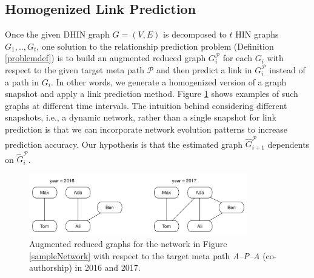 
\subsection{Homogenized Link Prediction}\label{def:HLP}

Once the given DHIN graph $G=(V,E)$ is decomposed to $t$ HIN graphs $G_1, .., G_t$, one solution to the relationship prediction problem (Definition \ref{problemdef}) is to build an augmented reduced graph $G_i^\mathcal{P}$ for each $G_i$ with respect to the given target meta path $\mathcal{P}$ and then predict a link in $G_i^\mathcal{P}$ instead of a path in $G_i$. In other words, we generate a homogenized version of a graph snapshot and apply a link prediction method. Figure \ref{targetARG} shows examples of such graphs at different time intervals. The intuition behind considering different snapshots, i.e., a dynamic network, rather than a single snapshot for link prediction is that we can incorporate network evolution patterns to increase prediction accuracy. Our hypothesis is that the estimated graph $\hat{G}_{i+1}^\mathcal{P}$ dependents on $\hat{G}_i^\mathcal{P}$. 

\begin{figure}[t]
\centering
\includegraphics[trim = 0mm 5mm 0mm 0mm,width=0.85\textwidth]{figs/exampletargetARG.pdf}
\caption{Augmented reduced graphs for the network in Figure \ref{sampleNetwork} with respect to the target meta path \textit{A--P--A} (co-authorship) in 2016 and 2017.}\label{targetARG}
\end{figure}




